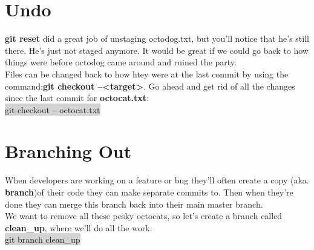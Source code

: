 \documentclass{article}
\begin{document}
\section{Undo}
\begin{minipage}[c]{0.66\textwidth}
	\parbox{\textwidth}{
		\textbf{git reset} did a great job of unstaging octodog.txt, but you'll notice that he's still there. He's just not staged anymore. It would be great if we could go back to how things were before octodog came around and ruined the party.\\
		Files can be changed back to how htey were at the last commit by using the command:\textbf{git checkout --<target>}. Go ahead and get rid of all the changes since the last commit for \textbf{octocat.txt}:\\
	\colorbox{lightgray}{git checkout -- octocat.txt}\\
	}
\end{minipage}
\hfill
\begin{minipage}[c]{0.32\textwidth}
\end{minipage}

\section{Branching Out}
\begin{minipage}[c]{0.66\textwidth}
	\parbox{\textwidth}{
		When developers are working on a feature or bug they'll often create a copy (aka. \textbf{branch})of their code they can make separate commits to. Then when they're done they can merge this branch back into their main master branch.\\
		We want to remove all these pesky octocats, so let's create a branch called \textbf{clean\_up}, where we'll do all the work:\\
		\colorbox{lightgray}{git branch clean\_up}\\
	}
\end{minipage}
\hfill
\begin{minipage}[c]{0.32\textwidth}
\end{minipage}
\end{document}
